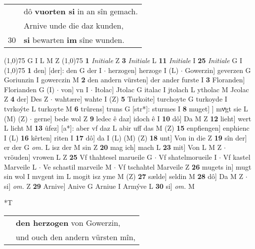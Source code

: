 \documentclass[8pt,a4paper,notitlepage]{article}
\begin{document}
\begin{table}[ht]
\begin{minipage}[t]{0.5\linewidth}
\begin{tabular}{rl}
 & dô \textbf{vuorten si} in an sîn gemach.\\ 
 & Arnive unde die daz kunden,\\ 
30 & \textbf{si} bewarten \textbf{im} sîne wunden.\\ 
\end{tabular}
\scriptsize
\line(1,0){75} \newline
G I L M Z \newline
\line(1,0){75} \newline
\textbf{1} \textit{Initiale} Z  \textbf{3} \textit{Initiale} L  \textbf{11} \textit{Initiale} I  \textbf{25} \textit{Initiale} G I  \newline
\line(1,0){75} \newline
\textbf{1} den] [der]: den G der I  $\cdot$ herzogen] herzoge I (L)  $\cdot$ Gowerzin] geverzen G Goriunzin I gowerczin M \textbf{2} den andern vürsten] der ander furste I \textbf{3} Floranden] Florianden G (I)  $\cdot$ von] vn I  $\cdot$ Itolac] Jtolac G italac I jtolach L ytholac M Jcolac Z \textbf{4} der] Des Z  $\cdot$ wahtære] wahte I (Z) \textbf{5} Turkoite] turchoyte G turkoyde I tvrkoýte L turkoyte M \textbf{6} trûrens] truns G [str*]: sturmes I \textbf{8} muget] ] mvͯgt sie L (M) (Z)  $\cdot$ gerne] bede wol Z \textbf{9} ledec ê daz] idoch ê I \textbf{10} dô] Da M Z \textbf{12} lieht] wert L licht M \textbf{13} ûfez] [a*]: aber vf daz L abir uff das M (Z) \textbf{15} enpfiengen] enphienc I (L) \textbf{16} kêrten] riten I \textbf{17} dô] da I (L) (M) (Z) \textbf{18} unt] Von in die Z \textbf{19} sîn der] er der G \textit{om.} L isz der M sin Z \textbf{20} mag ich] mach L \textbf{23} mit] Von L M Z  $\cdot$ vröuden] vrowen L Z \textbf{25} Vf thahtesel marueile G  $\cdot$ Vf shatelmorueile I  $\cdot$ Vf kastel Marveile L  $\cdot$ Ve schastil marveile M  $\cdot$ Vf tschahtel Marveile Z \textbf{26} mugets in] mugt sin wol I mvgent im L mogit isz yme M (Z) \textbf{27} sælde] seldin M \textbf{28} dô] Da M Z  $\cdot$ si] \textit{om.} Z \textbf{29} Arnive] Anive G Arniue I Armýve L \textbf{30} si] \textit{om.} M \newline
\end{minipage}
\hspace{0.5cm}
\begin{minipage}[t]{0.5\linewidth}
\small
\begin{center}*T
\end{center}
\begin{tabular}{rl}
 & \textbf{den herzogen} von Gowerzin,\\ 
 & und ouch den andern vürsten mîn,\\ 

\end{tabular}
\end{minipage}
\end{table}
\end{document}
